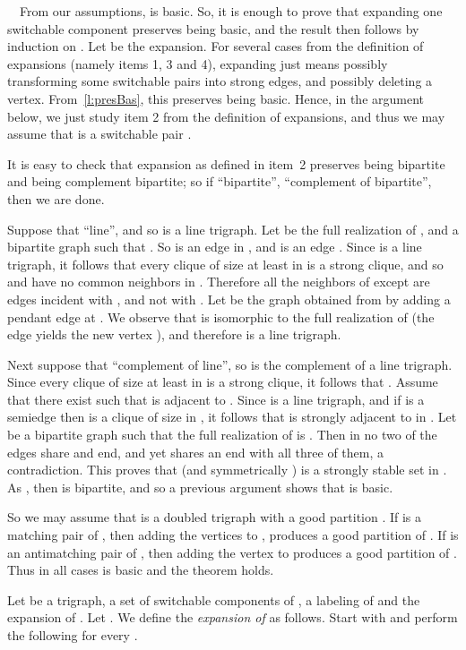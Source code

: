 \documentclass[11 pt] {article}
\newcommand\blackslug{\hbox{\hskip 1pt \vrule width 4pt height 8pt depth 1.5pt
        \hskip 1pt}}
\newcommand\bbox{\hfill \quad \blackslug \medbreak}
\newcounter{claim}
\newcommand{\Proof}{\setcounter{claim}{0}\noindent{\bf Proof.}\ \ }
\begin{document}
\Proof From our assumptions,  is basic.  So, it is enough to prove
that expanding one switchable component  preserves being basic, and
the result then follows by induction on . Let  be the
expansion.  For several cases from the definition of expansions
(namely items 1, 3 and 4), expanding just means possibly transforming
some switchable pairs into strong edges, and possibly deleting a
vertex.  From~\ref{l:presBas}, this preserves being basic. Hence, in
the argument below, we just study item 2 from the definition of
expansions, and thus we may assume that  is a switchable pair
. 

It is easy to check that expansion as defined in item~2 preserves
being bipartite and being complement bipartite; so if ``bipartite'', ``complement of bipartite'', then we are done.

Suppose that ``line'', and so  is a line trigraph.  Let  be
the full realization of , and  a bipartite graph such that .  So  is an edge  in , and  is an edge .  Since  is a line trigraph, it follows that every clique of
size at least  in  is a strong clique, and so  and  have
no common neighbors in . Therefore all the neighbors of  except
 are edges incident with , and not with .  Let  be
the graph obtained from  by adding a pendant edge  at .  We
observe that  is isomorphic to the full realization of 
(the edge  yields the new vertex ), and therefore  is a
line trigraph.


Next suppose that ``complement of line'', so  is the complement
of a line trigraph.  Since every clique of size at least  in
 is a strong clique, it follows that . Assume that there exist  such that
 is adjacent to . Since  is a line trigraph, and
if  is a semiedge then  is a clique of size  in
, it follows that  is strongly adjacent to  in
. Let  be a bipartite graph such that the full realization of
 is .  Then in  no two of the edges 
share and end, and yet  shares an end with all three of them, a
contradiction.  This proves that  (and
symmetrically ) is a strongly stable set in
. As , then  is bipartite, and so a
previous argument shows that  is basic.

 
So we may assume that  is a doubled trigraph with a good partition
. If  is a matching pair of , then adding the
vertices  to , produces a good partition of .  If
 is an antimatching pair of , then adding the vertex  to
 produces a good partition of . Thus in all cases  is basic
and the theorem holds.  \bbox


Let  be a trigraph,  a set of switchable components of ,
 a labeling of  and  the expansion of .  Let .  We define the  \emph{expansion
   of } as follows. Start with  and perform the following for  every . 
\end{document}
